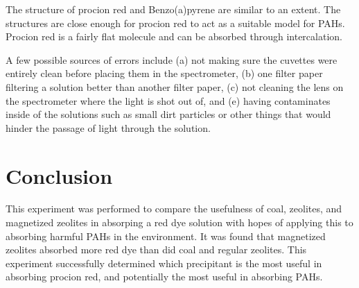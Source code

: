 \documentclass[11pt]{article} %
\begin{document}
The structure of procion red and Benzo(a)pyrene are similar to an extent. The structures are close enough for procion red to act as a suitable model for PAHs. Procion red is a fairly flat molecule and can be absorbed through intercalation.

A few possible sources of errors include (a) not making sure the cuvettes were entirely clean before placing them in the spectrometer, (b) one filter paper filtering a solution better than another filter paper, (c) not cleaning the lens on the spectrometer where the light is shot out of, and (e) having contaminates inside of the solutions such as small dirt particles or other things that would hinder the passage of light through the solution.

\section{Conclusion}
This experiment was performed to compare the usefulness of coal, zeolites, and magnetized zeolites in absorping a red dye solution with hopes of applying this to absorbing harmful PAHs in the environment. It was found that magnetized zeolites absorbed more red dye than did coal and regular zeolites. This experiment successfully determined which precipitant is the most useful in absorbing procion red, and potentially the most useful in absorbing PAHs.


\newpage 
 

\end{document}
